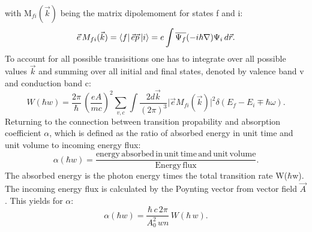 with M$_{fi}(\vec{k})$ being the matrix dipolemoment for states f and i:
\begin{equation}
	\vec{e}\,M_{fi}(\vec{k}) = \bra{f}\vec{e}\vec{p}\ket{i} = e \int \overline{\Psi_f} (-i\hbar\nabla) \Psi_i \,d\vec{r}.
\end{equation}
To account for all possible transisitions one has to integrate over all possible values $\vec{k}$ and summing over all initial and final states, denoted by valence band v and conduction band c:
\begin{equation}
	W(\hbar w) = \frac{2\pi}{\hbar}\,\left(\frac{eA}{mc}\right)^2 \sum_{v, c}\int \frac{2d\vec{k}}{(2\pi)^3}\lvert \vec{e} M_{fi}(\vec{k})\rvert ^2  \delta(E_f - E_i \mp \hbar \omega).
\end{equation}
Returning to the connection between transition propability and absorption coefficient $\alpha$, which is defined as the ratio of absorbed energy in unit time and unit volume to incoming energy flux:
\begin{equation}
	\alpha(\hbar w) = \frac{\mathrm{energy\,absorbed\,in \,unit\, time\, and \,unit\, volume}}{\mathrm{Energy\, flux}}.
\end{equation}
The absorbed energy is the photon energy times the total transition rate W($\hbar $w). The incoming energy flux is calculated by the Poynting vector from vector field $\vec{A}$. This yields for $\alpha$:
\begin{equation}
	\alpha(\hbar w) = \frac{\hbar\,c\,2\pi}{A_0^2\,wn}\,W(\hbar\,w).
\end{equation}